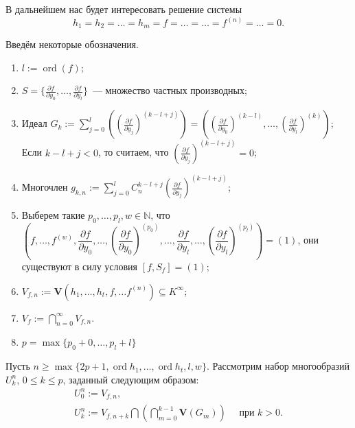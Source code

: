 \documentclass[16pt]{article}
\DeclareMathOperator{\ord}{ord}
\renewcommand{\le}{\leqslant} %
\renewcommand{\ge}{\geqslant} %
\theoremstyle{plain1}
\theoremstyle{plain2}
\theoremstyle{plain}
\theoremstyle{plain3}
\theoremstyle{definition}
\theoremstyle{remark}
\begin{document}
В дальнейшем нас будет интересовать решение системы
\begin{equation}
\label{eq1}
h_1=h_2=\ldots=h_m=f=\ldots=\ldots=f^{(n)}=\ldots=0.
\end{equation}

Введём некоторые обозначения.
\begin{enumerate}
  

  \item $l:=\ord (f);$
  
  \item $S= \{\frac{\partial f}{\partial y_0},\ldots, \frac{\partial f}{\partial y_l}\}$~--- множество частных производных;

  \item Идеал $G_k := \sum\limits_{j=0}^l\left(\left(\frac{\partial f}{\partial y_j}\right)^{(k-l+j)}\right) = \left(\left(\frac{\partial f}{\partial y_0}\right)^{(k-l)},\ldots ,\left(\frac{\partial f}{\partial y_l}\right)^{(k)} \right)$;
  \\Если $k-l+j<0$, то считаем, что $\left(\frac{\partial f}{\partial y_j}\right)^{(k-l+j)} = 0$;

  \item Многочлен $g_{k,n}:=\sum\limits_{j=0}^{l}C_n^{k-l+j}\left(\frac{\partial f}{\partial y_j}\right)^{(k-l+j)}$;

  \item Выберем  такие $p_0, \ldots, p_l, w\in \mathbb{N}$, что $\left(f,\ldots, f^{(w)}, \dfrac{\partial f}{\partial y_0},\ldots,(\dfrac{\partial f}{\partial y_0})^{(p_0)},\ldots, \dfrac{\partial f}{\partial y_l},\ldots,(\dfrac{\partial f}{\partial y_l})^{(p_l)}\right)=(1)$, они существуют в силу условия  $[f,S_f]=(1)$;

  \item ${V}_{f,n}:=\mathbf{V}\left(h_1,\ldots,h_t,f,\ldots f^{(n)}\right)\subseteq K^{\infty}$;

  \item  ${V}_{f}:=\bigcap\limits_{n=0}^{\infty}V_{f,n}$.
  
  \item $p= \max\{ p_0+0,\ldots,p_l+l\}$

\end{enumerate}



Пусть $n \ge\max\{2p+1,\ord{h_1},\ldots,\ord{h_t},l,w\}$. Рассмотрим набор многообразий ${U}_k^n$, $0\le k\le p$, заданный следующим образом:
\begin{gather*}
{U}_{0}^n:={V}_{f,n},\\
{U}_k^n:={V}_{f,n+k}\bigcap\left(\bigcap\limits_{m=0}^{k-1}\mathbf{V}\left(G_m\right)\right) \quad \text{ при } k>0.
\end{gather*}
\end{document}
